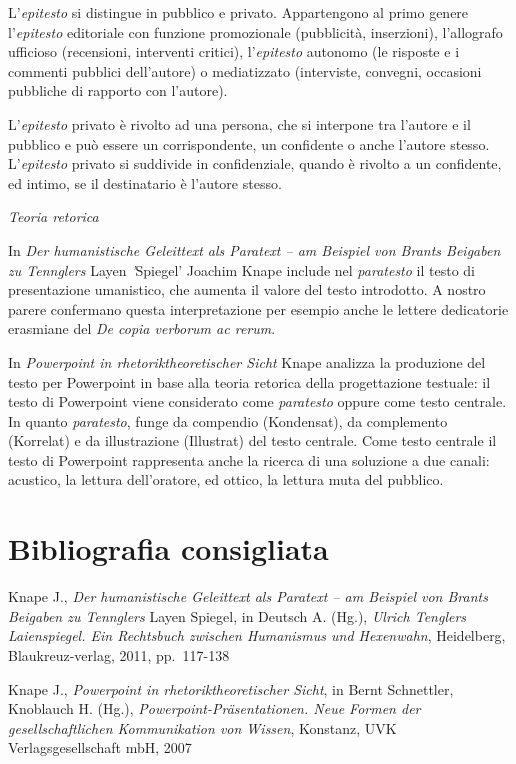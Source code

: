 \documentclass[
  b5paper,
  twoside,
  12pt,
  chapterprefix=false,
  bibliography=totocnumbered,
  parskip=false]{scrbook}
\begin{document}
L'\emph{epitesto} si distingue in pubblico e privato. Appartengono al primo
genere l'\emph{epitesto} editoriale con funzione promozionale (pubblicità,
inserzioni), l'allografo ufficioso (recensioni, interventi critici),
l'\emph{epitesto} autonomo (le risposte e i commenti pubblici dell'autore) o
mediatizzato (interviste, convegni, occasioni pubbliche di rapporto con
l'autore).

L'\emph{epitesto} privato è rivolto ad una persona, che si interpone tra
l'autore e il pubblico e può essere un corrispondente, un confidente o
anche l'autore stesso. L'\emph{epitesto} privato si suddivide in
confidenziale, quando è rivolto a un confidente, ed intimo, se il
destinatario è l'autore stesso.

\emph{Teoria retorica}

In \emph{Der humanistische Geleittext als Paratext -- am Beispiel von Brants
Beigaben zu Tennglers} Layen \emph{'}Spiegel' Joachim Knape include nel
\emph{paratesto} il testo di presentazione umanistico, che aumenta il valore
del testo introdotto. A nostro parere confermano questa interpretazione
per esempio anche le lettere dedicatorie erasmiane del \emph{De copia
verborum ac rerum}.

In \emph{Powerpoint in rhetoriktheoretischer Sicht} Knape analizza la
produzione del testo per Powerpoint in base alla teoria retorica della
progettazione testuale: il testo di Powerpoint viene considerato come
\emph{paratesto} oppure come testo centrale. In quanto \emph{paratesto}, funge da
compendio (Kondensat), da complemento (Korrelat) e da illustrazione
(Illustrat) del testo centrale. Come testo centrale il testo di
Powerpoint rappresenta anche la ricerca di una soluzione a due canali:
acustico, la lettura dell'oratore, ed ottico, la lettura muta del
pubblico.

\hypertarget{bibliografia-consigliata-20}{%
\section*{Bibliografia consigliata}\label{bibliografia-consigliata-20}}

Knape J., \emph{Der humanistische Geleittext als Paratext -- am Beispiel von
Brants Beigaben zu Tennglers} Layen Spiegel, in Deutsch A. (Hg.),
\emph{Ulrich Tenglers Laienspiegel. Ein Rechtsbuch zwischen Humanismus und
Hexenwahn}, Heidelberg, Blaukreuz-verlag, 2011, pp.~117-138

Knape J., \emph{Powerpoint in rhetoriktheoretischer Sicht}, in Bernt
Schnettler, Knoblauch H. (Hg.), \emph{Powerpoint-Präsentationen. Neue Formen
der gesellschaftlichen Kommunikation von Wissen}, Konstanz, UVK
Verlagsgesellschaft mbH, 2007
\end{document}
